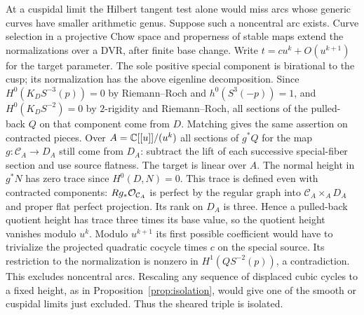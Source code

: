 At a cuspidal limit the Hilbert tangent test alone would miss arcs
whose generic curves have smaller arithmetic genus. Suppose such a
noncentral arc exists. Curve selection in a projective Chow space
and properness of stable maps extend the normalizations over a DVR,
after finite base change. Write $t=cu^k+O(u^{k+1})$ for the target
parameter. The sole positive special component is birational to the
cusp; its normalization has the above eigenline decomposition.
Since $H^0(K_DS^{-3}(p))=0$ by Riemann--Roch and
$h^0(S^3(-p))=1$, and $H^0(K_DS^{-2})=0$ by $2$-rigidity and
Riemann--Roch, all sections of the pulled-back $Q$ on that component
come from $D$. Matching gives the same assertion on contracted pieces.
Over $A=\mathbb C[[u]]/(u^k)$ all sections of $g^*Q$ for the map
$g:\mathcal C_A\to D_A$ still come from $D_A$: subtract the lift of
each successive special-fiber section and use source flatness.
The target is linear over $A$. The normal height in $g^*N$ has
zero trace since $H^0(D,N)=0$. This trace is defined even with
contracted components: $Rg_*\mathcal O_{\mathcal C_A}$ is perfect by the
regular graph into $\mathcal C_A\times_A D_A$ and proper flat
perfect projection. Its rank on $D_A$ is three. Hence a pulled-back
quotient height has trace three times its base value, so the quotient
height vanishes modulo $u^k$. Modulo $u^{k+1}$ its first possible
coefficient would have to trivialize the projected quadratic
cocycle times $c$ on the special source. Its restriction to the
normalization is nonzero in $H^1(QS^{-2}(p))$, a contradiction.
This excludes noncentral arcs. Rescaling any sequence of displaced
cubic cycles to a fixed height, as in Proposition~\ref{prop:isolation},
would give one of the smooth or cuspidal limits just excluded.
Thus the sheared triple is isolated.

